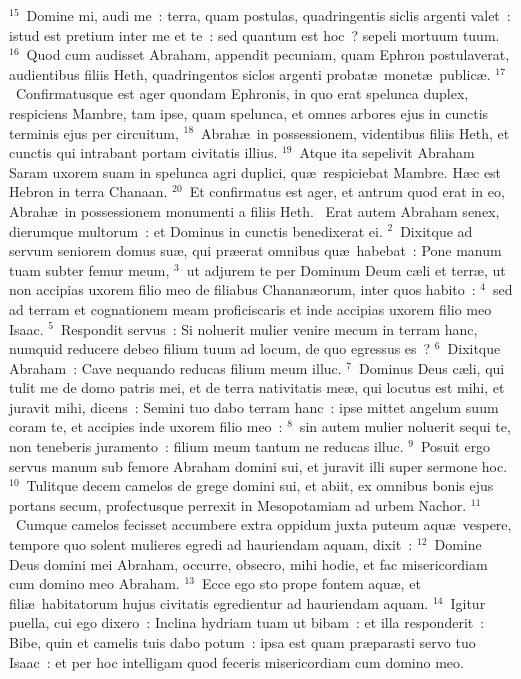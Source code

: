 ${}^{15}$~Domine mi, audi me~: terra, quam postulas, quadringentis siclis argenti valet~: istud est pretium inter me et te~: sed quantum est hoc~? sepeli mortuum tuum.
${}^{16}$~Quod cum audisset Abraham, appendit pecuniam, quam Ephron postulaverat, audientibus filiis Heth, quadringentos siclos argenti probat\ae\ monet\ae\ public\ae .
${}^{17}$~Confirmatusque est ager quondam Ephronis, in quo erat spelunca duplex, respiciens Mambre, tam ipse, quam spelunca, et omnes arbores ejus in cunctis terminis ejus per circuitum,
${}^{18}$~Abrah\ae\ in possessionem, videntibus filiis Heth, et cunctis qui intrabant portam civitatis illius.
${}^{19}$~Atque ita sepelivit Abraham Saram uxorem suam in spelunca agri duplici, qu\ae\ respiciebat Mambre. H\ae c est Hebron in terra Chanaan.
${}^{20}$~Et confirmatus est ager, et antrum quod erat in eo, Abrah\ae\ in possessionem monumenti a filiis Heth.
~Erat autem Abraham senex, dierumque multorum~: et Dominus in cunctis benedixerat ei.
${}^{2}$~Dixitque ad servum seniorem domus su\ae , qui pr\ae erat omnibus qu\ae\ habebat~: Pone manum tuam subter femur meum,
${}^{3}$~ut adjurem te per Dominum Deum c\ae li et terr\ae , ut non accipias uxorem filio meo de filiabus Chanan\ae orum, inter quos habito~:
${}^{4}$~sed ad terram et cognationem meam proficiscaris et inde accipias uxorem filio meo Isaac.
${}^{5}$~Respondit servus~: Si noluerit mulier venire mecum in terram hanc, numquid reducere debeo filium tuum ad locum, de quo egressus es~?
${}^{6}$~Dixitque Abraham~: Cave nequando reducas filium meum illuc.
${}^{7}$~Dominus Deus c\ae li, qui tulit me de domo patris mei, et de terra nativitatis me\ae , qui locutus est mihi, et juravit mihi, dicens~: Semini tuo dabo terram hanc~: ipse mittet angelum suum coram te, et accipies inde uxorem filio meo~:
${}^{8}$~sin autem mulier noluerit sequi te, non teneberis juramento~: filium meum tantum ne reducas illuc.
${}^{9}$~Posuit ergo servus manum sub femore Abraham domini sui, et juravit illi super sermone hoc.
${}^{10}$~Tulitque decem camelos de grege domini sui, et abiit, ex omnibus bonis ejus portans secum, profectusque perrexit in Mesopotamiam ad urbem Nachor.
${}^{11}$~Cumque camelos fecisset accumbere extra oppidum juxta puteum aqu\ae\ vespere, tempore quo solent mulieres egredi ad hauriendam aquam, dixit~:
${}^{12}$~Domine Deus domini mei Abraham, occurre, obsecro, mihi hodie, et fac misericordiam cum domino meo Abraham.
${}^{13}$~Ecce ego sto prope fontem aqu\ae , et fili\ae\ habitatorum hujus civitatis egredientur ad hauriendam aquam.
${}^{14}$~Igitur puella, cui ego dixero~: Inclina hydriam tuam ut bibam~: et illa responderit~: Bibe, quin et camelis tuis dabo potum~: ipsa est quam pr\ae parasti servo tuo Isaac~: et per hoc intelligam quod feceris misericordiam cum domino meo.

